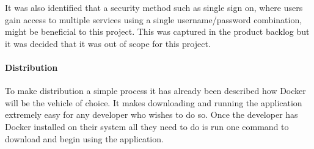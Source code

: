 It was also identified that a security method such as single sign on, where users gain access to multiple services using a single username/password combination, might be beneficial to this project. This was captured in the product backlog but it was decided that it was out of scope for this project.

\paragraph{Distribution}
To make distribution a simple process it has already been described how \gls{Docker} will be the vehicle of choice. It makes downloading and running the application extremely easy for any developer who wishes to do so. Once the developer has Docker installed on their system all they need to do is run one command to download and begin using the application.
